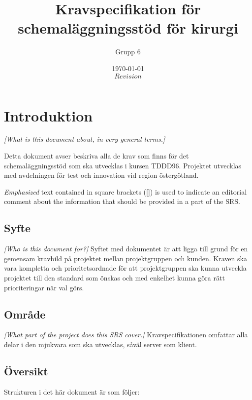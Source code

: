 \documentclass{article}
\begin{document}
\title{Kravspecifikation för schemaläggningsstöd för kirurgi}
\author{Grupp 6}
\date{\today \\ $Revision$ }



\maketitle
\tableofcontents


\section{Introduktion}
\emph{[What is this document about, in very general terms.]}

Detta dokument avser beskriva alla de krav som finns för det schemaläggningsstöd
som ska utvecklas i kursen TDDD96. Projektet utvecklas med avdelningen för test
och innovation vid region östergötland.

\emph{Emphasized} text contained in square brackets ([]) is used to indicate
an editorial comment about the information that should be provided in a part
of the \ac{SRS}.

\subsection{Syfte}
\emph{[Who is this document for?]}
Syftet med dokumentet är att ligga till grund för en gemensam kravbild på
projektet mellan projektgruppen och kunden. Kraven ska vara kompletta och
prioritetsordnade för att projektgruppen ska kunna utveckla projektet till den
standard som önskas och med enkelhet kunna göra rätt prioriteringar när val görs.

\subsection{Område}
\emph{[What part of the project does this SRS cover.]}
Kravspecifikationen omfattar alla delar i den mjukvara som ska utvecklas, såväl
server som klient.

\subsection{Översikt}
Strukturen i det här dokument är som följer:
\end{document}
